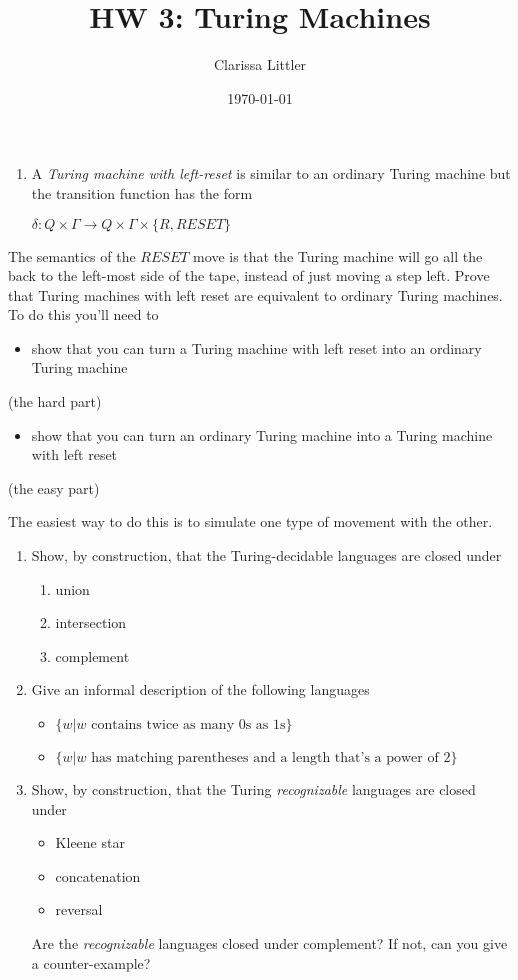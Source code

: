 \documentclass[11pt]{article}
\author{Clarissa Littler}
\date{\today}
\title{HW 3: Turing Machines}
\begin{document}
\maketitle
\begin{enumerate}
\item A \emph{Turing machine with left-reset} is similar to an ordinary Turing machine but the transition function has the form

$\delta : Q \times \Gamma \to Q \times \Gamma \times \{ R, RESET \}$
\end{enumerate}

The semantics of the $RESET$ move is that the Turing machine will go all the back to the left-most side of the tape, instead of just moving a step left. Prove that Turing machines with left reset are equivalent to ordinary Turing machines. To do this you'll need to 

\begin{itemize}
\item show that you can turn a Turing machine with left reset into an ordinary Turing machine
\end{itemize}
(the hard part)
\begin{itemize}
\item show that you can turn an ordinary Turing machine into a Turing machine with left reset
\end{itemize}
(the easy part)

The easiest way to do this is to simulate one type of movement with the other.

\begin{enumerate}
\item Show, by construction, that the Turing-decidable languages are closed under

\begin{enumerate}
\item union
\item intersection
\item complement
\end{enumerate}

\item Give an informal description of the following languages

\begin{itemize}
\item $\{ w | w \text{ contains twice as many 0s as 1s} \}$
\item $\{ w | w \text{ has matching parentheses and a length that's a power of 2}\}$
\end{itemize}

\item Show, by construction, that the Turing \emph{recognizable} languages are closed under

\begin{itemize}
\item Kleene star
\item concatenation
\item reversal
\end{itemize}
Are the \emph{recognizable} languages closed under complement? If not, can you give a counter-example?
\end{enumerate}
\end{document}
